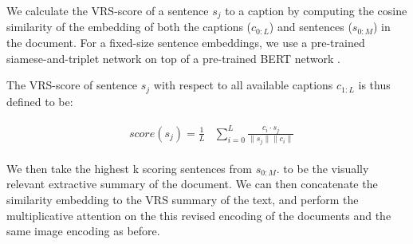 \documentclass[11pt,a4paper]{article}
\newcommand\gal[1]{\textcolor{bright}{\textbf{GAL:} #1 }}
\newcommand\yuval[1]{\textcolor{darkpink}{\textbf{YUVAL:} #1 }}
\newcommand\tzuf[1]{\textcolor{blue}{\textbf{TZUF:} #1 }}
\begin{document}


We calculate the VRS-score of a sentence $s_j$ to a caption by computing the cosine similarity of the embedding of both the captions ($c_{0:L}$) and sentences ($s_{0:M}$) in the document. For a fixed-size sentence embeddings, we use a pre-trained siamese-and-triplet network \citep{reimers2019sentence, Schroff_2015_CVPR} on top of a pre-trained BERT network  \cite{devlin2019bert}.


The VRS-score of sentence $s_j$ with respect to all available captions   $c_{1:L}$  is thus defined to be:


\begin{equation}
\begin{aligned}
\begin{split}
\label{eq:score}
&score(s_j)=  \frac{1}{L}
&\sum_{i=0}^{L} \frac{c_i\cdot s_j}{\| s_j\|\| c_i\| }
\end{split}
\end{aligned}
\end{equation}


We then take the highest k scoring sentences from \(s_{0:M}\). 
to be the visually relevant extractive summary of the document. We can then concatenate the similarity embedding to the VRS summary of the text, and perform the multiplicative attention on the this  revised encoding of the documents and the same image encoding as before.\par
\end{document}
